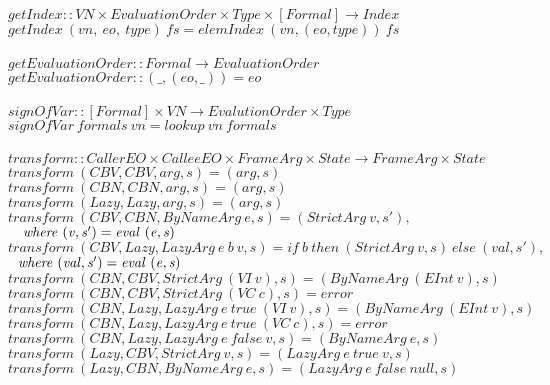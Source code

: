 \documentclass[diploma]{softlab-thesis}
\begin{document}
\begin{figure}[h]
  $\mathit{getIndex :: VN \times EvaluationOrder \times Type \times [Formal] \rightarrow Index}$ \\
  $\mathit{getIndex~(vn,~eo,~type)~fs=elemIndex~(vn,(eo,type))~fs}$ \\
  \\
  $\mathit{getEvaluationOrder :: Formal \rightarrow EvaluationOrder} $ \\
  $\mathit{getEvaluationOrder :: (\_, (eo, \_)) = eo}$ \\
  \\%
  $\mathit{signOfVar :: [Formal] \times VN \rightarrow EvalutionOrder \times Type } $ \\
  $\mathit{signOfVar~formals~vn = lookup~vn~formals}$ \\
  \\%
  $\mathit{transform :: CallerEO \times CalleeEO \times FrameArg \times 
            State \rightarrow FrameArg \times State}$ \\
  $\mathit{transform~(CBV, CBV, arg, s) = (arg, s)}$ \\
  $\mathit{transform~(CBN, CBN, arg, s) = (arg, s)}$ \\
  $\mathit{transform~(Lazy, Lazy, arg, s) = (arg, s)}$ \\
  $\mathit{transform~(CBV, CBN, ByNameArg~e, s) = (StrictArg~v, s'),}$ \\
  $\mathit{\hspace*{1em} where~(v, s') = eval~(e, s)}$ \\
  $\mathit{transform~(CBV, Lazy, LazyArg~e~b~v, s) = 
              if~b~then~(StrictArg~v, s)~else~(val, s'),}$ \\
  $\mathit{\hfill\ \hfill\ where~(val, s') = eval~(e, s)} $ \\
  $\mathit{transform~(CBN, CBV, StrictArg~(VI~v),s)=(ByNameArg~(EInt~v),s)}$ \\
  $\mathit{transform~(CBN, CBV, StrictArg~(VC~c),s)=error}$ \\
  $\mathit{transform~(CBN, Lazy, LazyArg~e~true~(VI~v), s) = (ByNameArg~(EInt~v), s)}$ \\
  $\mathit{transform~(CBN, Lazy, LazyArg~e~true~(VC~c), s) = error}$ \\
  $\mathit{transform~(CBN, Lazy, LazyArg~e~false~v, s) = (ByNameArg~e, s)}$ \\
  $\mathit{transform~(Lazy, CBV, StrictArg~v, s) = (LazyArg~e~true~v, s)}$ \\
  $\mathit{transform~(Lazy, CBN, ByNameArg~e, s) = (LazyArg~e~false~null, s)}$ \\

\end{figure}
\end{document}

